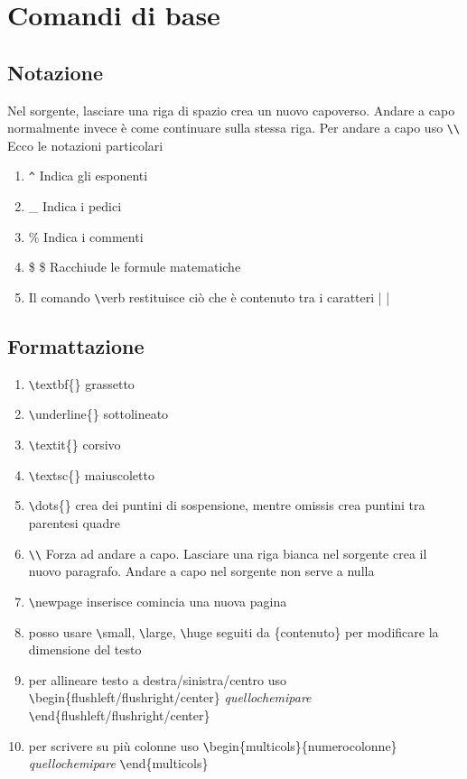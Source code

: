 \chapter{Comandi di base}
\section{Notazione}
Nel sorgente, lasciare una riga di spazio crea un nuovo capoverso. Andare a capo normalmente invece è come continuare sulla stessa riga. Per andare a capo uso \verb|\\|
Ecco le notazioni particolari
\begin{enumerate}
	\item \verb|^| Indica gli esponenti
	\item \_ Indica i pedici
	\item \% Indica i commenti
	\item \$ \$ Racchiude le formule matematiche
	\item Il comando \verb|\|verb restituisce ciò che è contenuto tra i caratteri | |
\end{enumerate}

\section{Formattazione}
\begin{enumerate}
	\item \verb|\|textbf\{\} grassetto
	\item \verb|\|underline\{\} sottolineato
	\item \verb|\|textit\{\} corsivo
	\item \verb|\|textsc\{\} maiuscoletto
	\item \verb|\|dots\{\} crea dei puntini di sospensione, mentre omissis crea puntini tra parentesi quadre
	\item \verb|\\| Forza ad andare a capo. Lasciare una riga bianca nel sorgente crea il nuovo paragrafo. Andare a 		capo nel sorgente non serve a nulla
	\item \verb|\|newpage inserisce comincia una nuova pagina
	\item posso usare \verb|\|small, \verb|\|large, \verb|\|huge seguiti da \{contenuto\} per modificare la dimensione del testo
	\item per allineare testo a destra/sinistra/centro uso \verb|\|begin\{flushleft/flushright/center\} 
\textit{quellochemipare} \verb|\|end\{flushleft/flushright/center\}
	\item per scrivere su più colonne uso \verb|\|begin\{multicols\}\{numerocolonne\} 
\textit{quellochemipare} \verb|\|end\{multicols\}
\end{enumerate}

